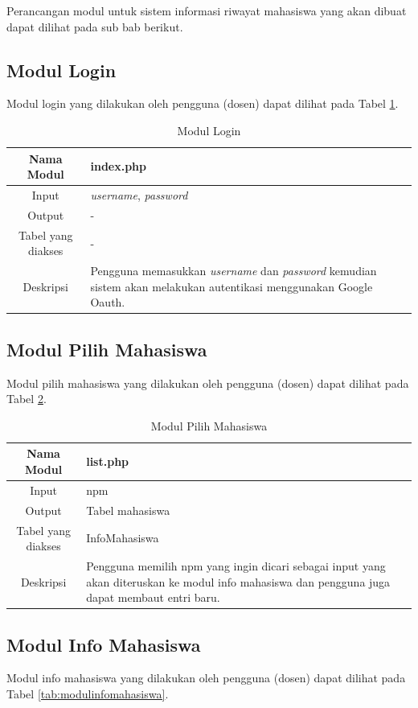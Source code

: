 Perancangan modul untuk sistem informasi riwayat mahasiswa yang akan dibuat
dapat dilihat pada sub bab berikut.

\subsection{Modul Login}
Modul login yang dilakukan oleh pengguna (dosen) dapat dilihat pada Tabel
\ref{tab:modullogin}.

\begin{table}[h]
\centering
\caption[Tabel Modul Login]{Modul Login}
\label{tab:modullogin}
\begin{tabular}{|c|p{7cm}|}
\hline
Nama Modul & index.php\\
\hline
Input & {\it username}, {\it password}\\
\hline
Output & -\\
\hline
Tabel yang diakses & -\\
\hline
Deskripsi & Pengguna memasukkan {\it username} dan {\it password} kemudian
sistem akan melakukan autentikasi menggunakan Google Oauth.\\
\hline
\end{tabular}
\end{table}

\subsection{Modul Pilih Mahasiswa}
Modul pilih mahasiswa yang dilakukan oleh pengguna (dosen) dapat dilihat pada
Tabel \ref{tab:modulpilihmahasiswa}.

\begin{table}[h]
\centering
\caption[Tabel Modul Pilih Mahasiswa]{Modul Pilih Mahasiswa}
\label{tab:modulpilihmahasiswa}
\begin{tabular}{|c|p{7cm}|}
\hline
Nama Modul & list.php\\
\hline
Input & npm\\
\hline
Output & Tabel mahasiswa\\
\hline
Tabel yang diakses & InfoMahasiswa\\
\hline
Deskripsi & Pengguna memilih npm yang ingin dicari sebagai input yang akan
diteruskan ke modul info mahasiswa dan pengguna juga dapat membaut entri baru.\\
\hline
\end{tabular}
\end{table}

\subsection{Modul Info Mahasiswa}
Modul info mahasiswa yang dilakukan oleh pengguna (dosen) dapat dilihat pada
Tabel \ref{tab:modulinfomahasiswa}.

